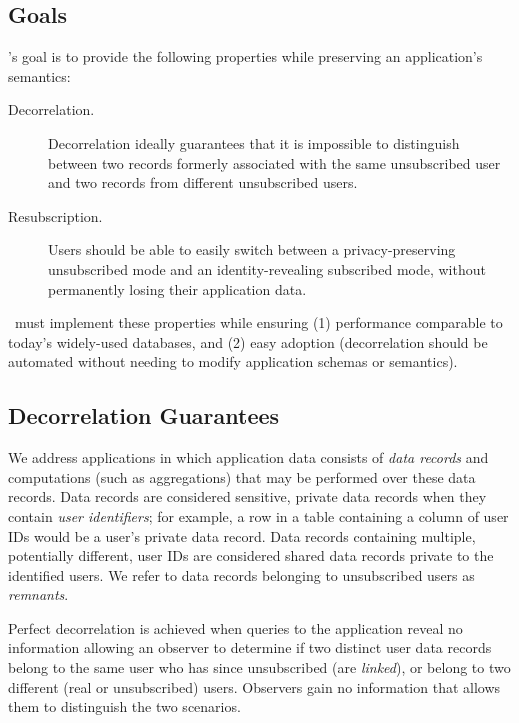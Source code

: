 \subsection{Goals} 
\sys's goal is to provide the following properties while preserving an application's 
semantics: 
\begin{description} 
    \item[Decorrelation.] Decorrelation ideally guarantees that it is impossible to distinguish
        between two records formerly associated with the same unsubscribed user and two records from
        different unsubscribed users.  
    \item[Resubscription.] Users should be able to easily switch between a privacy-preserving unsubscribed mode 
       and an identity-revealing subscribed mode, without permanently losing their application data.  
\end{description}

\sys~must implement these properties while ensuring (1) performance comparable to today’s
widely-used databases, and (2) easy adoption (decorrelation should be
automated without needing to modify application schemas or semantics).

\subsection{Decorrelation Guarantees} 
We address applications in which application data consists of \emph{data records} and computations
(such as aggregations) that may be performed over these data records. Data records are considered
sensitive, private data records when they contain \emph{user identifiers}; for example, a row in a
table containing a column of user IDs would be a user's private data record. Data records containing
multiple, potentially different, user IDs are considered shared data records private to the
identified users. We refer to data records belonging to unsubscribed users as \emph{remnants}.

Perfect decorrelation is achieved when queries to the application reveal no information allowing an
observer to determine if two distinct user data records belong to the same user who has since
unsubscribed (are \emph{linked}), or belong to two different (real or unsubscribed) users. Observers
gain no information that allows them to distinguish the two scenarios. 

